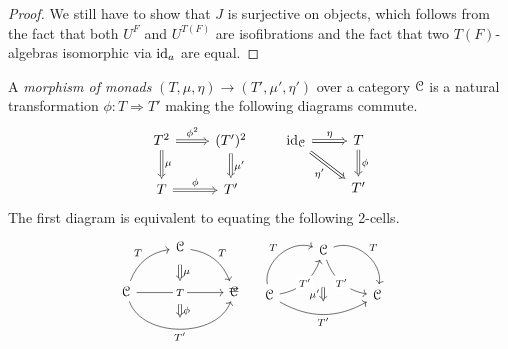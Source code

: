 \documentclass[a4paper,11pt,oneside,openany]{scrbook}
\begin{document}
\begin{proof}
	We still have to show that $J$ is surjective on objects, which follows from the fact that both $U^F$ and $U^{T(F)}$ are isofibrations and the fact that two $T(F)$-algebras isomorphic via $\operatorname{id}_a$ are equal.
\end{proof}

\begin{defn}
	A \emph{morphism of monads} $(T,\mu,\eta)\rightarrow (T',\mu',\eta')$ over a
    category $\operatorname{\mathcal{C}}$ is a natural transformation $\phi\colon T\Rightarrow T'$
    making the following diagrams commute.
	\[
		\begin{tikzcd}
			T^2\ar[d, Rightarrow, "\mu"]\ar[r, Rightarrow, "\phi^2"]
			& (T')^2\ar[d, Rightarrow, "\mu'"] \\
			T\ar[r, Rightarrow, "\phi"]
			& T'
		\end{tikzcd}
		\quad\quad
		\begin{tikzcd}
			\id_{\C}\ar[r, Rightarrow, "\eta"]\ar[dr, Rightarrow, swap, "\eta'"]
			& T\ar[d, Rightarrow, "\phi"] \\
			& T'
		\end{tikzcd}
	\]
	The first diagram is equivalent to equating the following 2-cells.
	\[
		\begin{minipage}{0.3\linewidth}
			\begin{tikzcd}
				& \C\ar[dr, bend left, "T"]\ar[d, Rightarrow, shorten <= .6em, shorten >= .6em, "\mu"] \\
				\C\ar[rr, "T" description, ""{name=T1, anchor=center}]\ar[ur, bend left, "T"]\ar[rr, bend right=70, swap, "T'", ""{name=T2, anchor=center}]
				& \phantom{.}
				& \C
				\ar[Rightarrow, shorten <= .6em, shorten >= .6em, "\phi", from=T1, to=T2]
			\end{tikzcd}
		\end{minipage}
		\hspace{-0.9cm}
		=
		\hspace{.4cm}
		\begin{minipage}{0.3\linewidth}
			\begin{tikzcd}
				& \C\ar[dr, bend left=60, "T", ""{name=T12, anchor=center}]\ar[dr, bend right, "T'" description, ""{name=T22, anchor=center}]\ar[dd, Rightarrow, shorten <= 2em, shorten >= 2em, swap, "\mu'"] \\
				\C\ar[ur, bend left=60, "T", ""{name=T11, anchor=center}]\ar[ur, bend right, "T'" description, ""{name=T21, anchor=center}]\ar[rr, bend right, swap, "T'"]
				&& \C \\
				& \phantom{.}

\end{tikzcd}
\end{minipage}\]
\end{defn}
\end{document}
